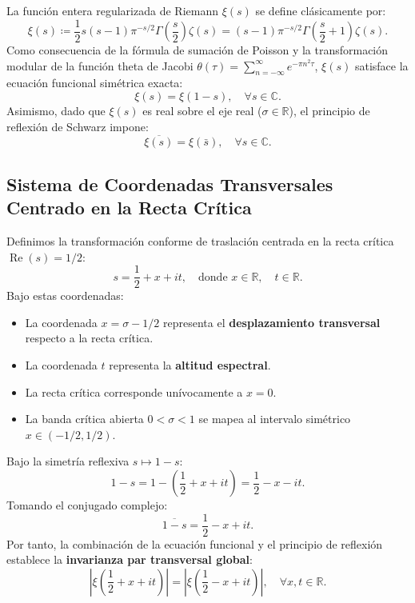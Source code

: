 \documentclass[11pt,a4paper]{article}
\theoremstyle{definition}
\theoremstyle{remark}
\begin{document}
La función entera regularizada de Riemann $\xi(s)$ se define clásicamente por:
\begin{equation}
\xi(s) \coloneqq \frac{1}{2} s (s - 1) \pi^{-s/2} \Gamma\left(\frac{s}{2}\right) \zeta(s) = (s - 1) \pi^{-s/2} \Gamma\left(\frac{s}{2} + 1\right) \zeta(s).
\end{equation}
Como consecuencia de la fórmula de sumación de Poisson y la transformación modular de la función theta de Jacobi $\theta(\tau) = \sum_{n=-\infty}^\infty e^{-\pi n^2 \tau}$, $\xi(s)$ satisface la ecuación funcional simétrica exacta:
\begin{equation}
\xi(s) = \xi(1 - s), \quad \forall s \in \mathbb{C}.
\end{equation}
Asimismo, dado que $\xi(s)$ es real sobre el eje real ($\sigma \in \mathbb{R}$), el principio de reflexión de Schwarz impone:
\begin{equation}
\overline{\xi(s)} = \xi(\bar{s}), \quad \forall s \in \mathbb{C}.
\end{equation}

\subsection{Sistema de Coordenadas Transversales Centrado en la Recta Crítica}

Definimos la transformación conforme de traslación centrada en la recta crítica $\operatorname{Re}(s) = 1/2$:
\begin{equation}
s = \frac{1}{2} + x + it, \quad \text{donde } x \in \mathbb{R}, \quad t \in \mathbb{R}.
\end{equation}
Bajo estas coordenadas:
\begin{itemize}
    \item La coordenada $x = \sigma - 1/2$ representa el \textbf{desplazamiento transversal} respecto a la recta crítica.
    \item La coordenada $t$ representa la \textbf{altitud espectral}.
    \item La recta crítica corresponde unívocamente a $x = 0$.
    \item La banda crítica abierta $0 < \sigma < 1$ se mapea al intervalo simétrico $x \in (-1/2, 1/2)$.
\end{itemize}

Bajo la simetría reflexiva $s \mapsto 1 - s$:
\begin{equation}
1 - s = 1 - \left(\frac{1}{2} + x + it\right) = \frac{1}{2} - x - it.
\end{equation}
Tomando el conjugado complejo:
\begin{equation}
\overline{1 - s} = \frac{1}{2} - x + it.
\end{equation}
Por tanto, la combinación de la ecuación funcional y el principio de reflexión establece la \textbf{invarianza par transversal global}:
\begin{equation}
\left| \xi\left(\frac{1}{2} + x + it\right) \right| = \left| \xi\left(\frac{1}{2} - x + it\right) \right|, \quad \forall x, t \in \mathbb{R}.
\end{equation}
\end{document}
